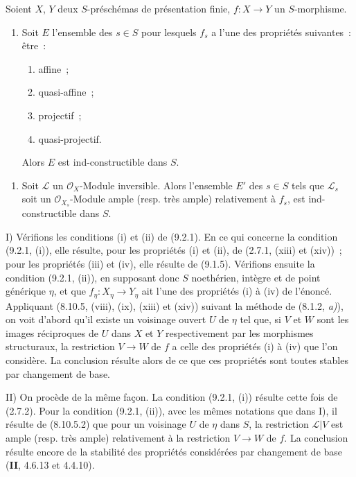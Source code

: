 \begin{proposition}[9.6.2]
\label{IV.9.6.2-fr}
Soient $X$, $Y$ deux $S$-préschémas de présentation finie, $f:X\to Y$ un
$S$-morphisme.
\begin{enumerate}[label=\upshape{I)}]
  \item Soit $E$ l'ensemble des $s\in S$ pour lesquels $f_s$ a l'une des
  propriétés suivantes~: être~:
  \begin{enumerate}[label=(\roman*)]
    \item affine~;
    \item quasi-affine~;
    \item projectif~;
    \item quasi-projectif.
  \end{enumerate}
  Alors $E$ est ind-constructible dans $S$.
\end{enumerate}


\begin{enumerate}[label=\upshape{II)}]
  \item Soit $\mathcal L$ un $\mathcal O_X$-Module inversible. Alors l'ensemble
  $E'$ des $s\in S$ tels que $\mathcal L_s$ soit un $\mathcal O_{X_s}$-Module
  ample (resp. très ample) relativement à $f_s$, est ind-constructible dans
  $S$.
\end{enumerate}
\end{proposition}

I) Vérifions les conditions (i) et (ii) de (9.2.1). En ce qui concerne la
condition (9.2.1, (i)), elle résulte, pour les propriétés (i) et (ii), de
(2.7.1, (xiii) et (xiv))~; pour les propriétés (iii) et (iv), elle résulte de
(9.1.5). Vérifions ensuite la condition (9.2.1, (ii)), en supposant donc $S$
noethérien, intègre et de point générique $\eta$, et que
$f_\eta:X_\eta\to Y_\eta$ ait l'une des propriétés (i) à (iv) de l'énoncé.
Appliquant (8.10.5, (viii), (ix), (xiii) et (xiv)) suivant la méthode de
(8.1.2, \emph{a)}), on voit d'abord qu'il existe un voisinage ouvert $U$ de
$\eta$ tel que, si $V$ et $W$ sont les images réciproques de $U$ dans $X$ et
$Y$ respectivement par les morphismes structuraux, la restriction $V\to W$ de
$f$ a celle des propriétés (i) à (iv) que l'on considère. La conclusion
résulte alors de ce que ces propriétés sont toutes stables par changement de
base.

II) On procède de la même façon. La condition (9.2.1, (i)) résulte cette fois
de (2.7.2). Pour la condition (9.2.1, (ii)), avec les mêmes notations que dans
I), il résulte de (8.10.5.2) que pour un voisinage $U$ de $\eta$ dans $S$, la
restriction $\mathcal L|V$ est ample (resp. très ample) relativement à la
restriction $V\to W$ de $f$. La conclusion résulte encore de la stabilité des
propriétés considérées par changement de base (\textbf{II}, 4.6.13 et
4.4.10).

